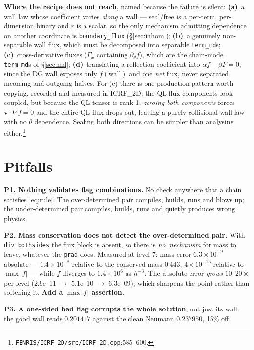 \documentclass[10pt]{article}
\newcommand{\code}[1]{\texttt{#1}}
\begin{document}
\textbf{Where the recipe does not reach}, named because the failure is silent:
\textbf{(a)}~a wall law whose coefficient varies \emph{along} a wall --- seal/free
is a per-term, per-dimension binary and $r$ is a scalar, so the only mechanism
admitting dependence on another coordinate is \code{boundary\_flux}
(\S\ref{sec:inhom}); \textbf{(b)}~a genuinely non-separable wall flux, which must
be decomposed into separable \code{term\_md}s; \textbf{(c)}~cross-derivative
fluxes ($\Gamma_x$ containing $\partial_\theta f$), which are the chain-mode
\code{term\_md}s of \S\ref{sec:md}; \textbf{(d)}~translating a reflection
coefficient into $\alpha f+\beta F=0$, since the DG wall exposes only
$f(\text{wall})$ and one \emph{net} flux, never separated incoming and outgoing
halves. For (c) there is one production pattern worth copying, recorded and
measured in ICRF\_2D: the QL flux components look coupled, but because the QL
tensor is rank-1, \emph{zeroing both components} forces
$\mathbf v\!\cdot\!\nabla f=0$ and the entire QL flux drops out, leaving a purely
collisional wall law with no $\theta$ dependence. Sealing both directions can be
simpler than analysing
either.\footnote{\code{FENRIS/ICRF\_2D/src/ICRF\_2D.cpp}:585--600.}

\section{Pitfalls}
\label{sec:pitfalls}

\textbf{P1. Nothing validates flag combinations.} No check anywhere that a chain
satisfies \eqref{eq:rule}. The over-determined pair compiles, builds, runs and
blows up; the under-determined pair compiles, builds, runs and quietly produces
wrong physics.

\textbf{P2. Mass conservation does not detect the over-determined pair.} With
\code{div bothsides} the flux block is absent, so there is \emph{no mechanism} for
mass to leave, whatever the \code{grad} does. Measured at level 7: mass error
$6.3\times10^{-9}$ absolute --- $1.4\times10^{-8}$ relative to the conserved mass
$0.443$, $4\times10^{-15}$ relative to $\max|f|$ --- while $f$ diverges to
$1.4\times10^{6}$ as $h^{-3}$. The absolute error \emph{grows} $10$--$20\times$
per level ($2.9$e--11 $\to$ $5.1$e--10 $\to$ $6.3$e--09), which sharpens the point
rather than softening it. \textbf{Add a $\max|f|$ assertion.}

\textbf{P3. A one-sided bad flag corrupts the whole solution}, not just its wall:
the good wall reads $0.201417$ against the clean Neumann $0.237950$, 15\% off.
\end{document}
